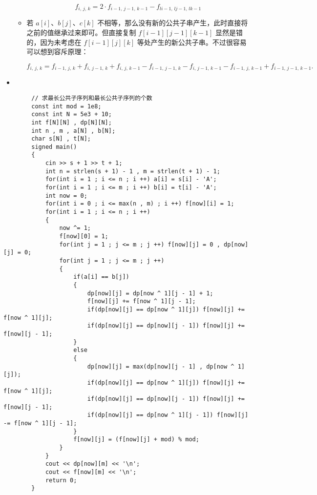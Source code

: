 \documentclass[E:/GsjzTle/main/main.tex]{subfiles}
\begin{document}
\begin{itemize}
\begin{itemize}
			\[f_{i,\,j,\,k} = 2\cdot f_{i-1,\,j-1,\,k-1} - f_{li-1,\,lj-1,\,lk-1}\]
			\item
			若 \(a[i]\)、\(b[j]\)、\(c[k]\)
			不相等，那么没有新的公共子串产生，此时直接将之前的值继承过来即可。但直接复制
			\(f[i-1][j-1][k-1]\) 显然是错的，因为未考虑在 \(f[i-1][j][k]\)
			等处产生的新公共子串。不过很容易可以想到容斥原理：
			
			\(f_{i,\,j,\,k} =f_{i-1,\,j,\,k} + f_{i,\,j-1,\,k} + f_{i,\,j,\,k-1} - f_{i-1,\,j-1,\,k} - f_{i,\,j-1,\,k-1} - f_{i-1,\,j,\,k-1} + f_{i-1,\,j-1,\,k-1}. \)
		\end{itemize}
		\item
	\end{itemize}
	
	\begin{lstlisting}
		// 求最长公共子序列和最长公共子序列的个数
		const int mod = 1e8;
		const int N = 5e3 + 10;
		int f[N][N] , dp[N][N];
		int n , m , a[N] , b[N];
		char s[N] , t[N];
		signed main()
		{
			cin >> s + 1 >> t + 1;
			int n = strlen(s + 1) - 1 , m = strlen(t + 1) - 1;
			for(int i = 1 ; i <= n ; i ++) a[i] = s[i] - 'A';
			for(int i = 1 ; i <= m ; i ++) b[i] = t[i] - 'A';
			int now = 0;
			for(int i = 0 ; i <= max(n , m) ; i ++) f[now][i] = 1;
			for(int i = 1 ; i <= n ; i ++)
			{
				now ^= 1;
				f[now][0] = 1;
				for(int j = 1 ; j <= m ; j ++) f[now][j] = 0 , dp[now][j] = 0;
				for(int j = 1 ; j <= m ; j ++)
				{
					if(a[i] == b[j]) 
					{
						dp[now][j] = dp[now ^ 1][j - 1] + 1;
						f[now][j] += f[now ^ 1][j - 1];
						if(dp[now][j] == dp[now ^ 1][j]) f[now][j] += f[now ^ 1][j];
						if(dp[now][j] == dp[now][j - 1]) f[now][j] += f[now][j - 1];
					}
					else
					{
						dp[now][j] = max(dp[now][j - 1] , dp[now ^ 1][j]);
						if(dp[now][j] == dp[now ^ 1][j]) f[now][j] += f[now ^ 1][j];
						if(dp[now][j] == dp[now][j - 1]) f[now][j] += f[now][j - 1];
						if(dp[now][j] == dp[now ^ 1][j - 1]) f[now][j] -= f[now ^ 1][j - 1];
					}
					f[now][j] = (f[now][j] + mod) % mod;
				}
			}
			cout << dp[now][m] << '\n';
			cout << f[now][m] << '\n';
			return 0;
		}
	\end{lstlisting}
	
\end{document}
